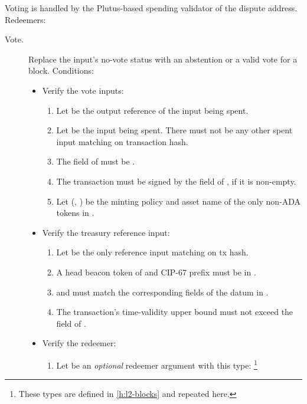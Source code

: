 \documentclass[../hydrozoa.tex]{subfiles}
\begin{document}
Voting is handled by the Plutus-based spending validator of the dispute address.
Redeemers:
\begin{description}
  \item[Vote.] Replace the input's no-vote status with an abstention or a valid vote for a block.
  Conditions:
    \begin{itemize}
      \item Verify the vote inputs:
        \begin{enumerate}
          \item Let  be the output reference of the input being spent.
          \item Let  be the input being spent.
            There must not be any other spent input matching  on transaction hash.
          \item The  field of  must be .
          \item The transaction must be signed by the  field of , if it is non-empty.
          \item Let (, ) be the minting policy and asset name of the only non-ADA tokens in .
        \end{enumerate}
      \item Verify the treasury reference input:
        \begin{enumerate}[resume]
          \item Let  be the only reference input matching  on tx hash.
          \item A head beacon token of  and CIP-67 prefix \headBeaconToken{} must be in .
          \item {} and  must match the corresponding fields of the  datum in .
          \item The transaction's time-validity upper bound must not exceed the  field of .
        \end{enumerate}
      \item Verify the redeemer:
        \begin{enumerate}[resume]
          \item Let  be an \emph{optional} redeemer argument with this type:%
            \footnote{These types are defined in \cref{h:l2-blocks} and repeated here.}

\end{enumerate}
\end{itemize}
\end{description}
\end{document}
